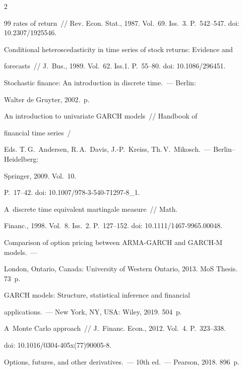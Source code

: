 \begin{multicols}{2}
{{\begin{thebibliography}{99}
rates of return~//  Rev. Econ. Stat., 1987. Vol.~69. Iss.~3. P.~542--547. doi: 10.2307/1925546.




 Conditional heteroscedasticity in time series of stock returns: Evidence and 


forecasts~// J.~Bus., 1989. Vol.~62. Iss.1. P.~55--80. doi: 10.1086/296451.




 Stochastic finance: An introduction in discrete time.~--- Berlin: 


Walter de Gruyter, 2002.~p.




 An introduction to univariate GARCH models~//  Handbook of 


financial time series~/


Eds. T.\,G.~Andersen, R.\,A.~Davis, J.-P.~Kreiss, Th.\,V.~Mikosch.~--- Berlin--Heidelberg: 


Springer, 2009. Vol.~10.  


P.~17--42. doi: 10.1007/978-3-540-71297-8\_1.




 A~discrete time equivalent martingale measure~// Math. 


Financ., 1998. Vol.~8. Iss.~2. P.~127--152. doi: 10.1111/1467-9965.00048.




 Comparison of option pricing between ARMA-GARCH and GARCH-M models.~--- 


London, Ontario, Canada: University of Western Ontario, 2013. MoS Thesis. 73~p.




 GARCH models: Structure, statistical inference and financial 


applications.~--- New York, NY, USA: Wiley, 2019. 504~p.




 A~Monte Carlo approach~// J.~Financ. Econ., 2012. Vol.~4. P.~323--338. 


doi: 10.1016/0304-405x(77)90005-8.




 Options, futures, and other derivatives.~--- 10th ed.~--- Pearson, 2018. 896~p.



\end{thebibliography}}}
\end{multicols}
